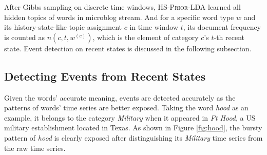 \documentclass{article}
\begin{document}

After Gibbs sampling on discrete time windows, \textsc{HS-Prior-LDA} learned all hidden topics of words in microblog stream.
And for a specific word type \(w\) and its history-state-like topic assignment \(c\) in time window \(t\), its document frequency is counted as \(n(c,t,w^{(c)})\), which is the element of category \(c\)'s \(t\)-th recent state.
Event detection on recent states is discussed in the following subsection.

\subsection{Detecting Events from Recent States}
\label{subsec:detection}
Given the words' accurate meaning, events are  detected accurately as the patterns of words' time series are better exposed.
Taking the word \textit{hood} as an example, it belongs to the category \textit{Military} when it appeared in \textit{Ft Hood}, a US military establishment located in Texas.
As shown in Figure \ref{fig:hood}, the bursty pattern of \textit{hood} is clearly exposed after distinguishing its \textit{Military} time series from the raw time series.
\end{document}
